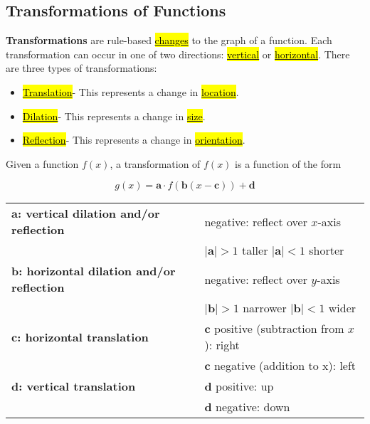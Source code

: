 \newpage

\subsection{Transformations of Functions}
\begin{definition}[transformation]
 \textbf{Transformations} are rule-based \underline{\hl{changes}} to the graph of a function. Each transformation can occur in one of two directions: \underline{\hl{vertical}} or \underline{\hl{horizontal}}. There are three types of transformations:
\begin{itemize}
    \item \underline{\hl{Translation}}- This represents a change in \underline{\hl{location}}.
    \item \underline{\hl{Dilation}}- This represents a change in \underline{\hl{size}}.
    \item \underline{\hl{Reflection}}- This represents a change in \underline{\hl{orientation}}.
\end{itemize}
\end{definition}
Given a function $f(x)$, a transformation of $f(x)$ is a function of the form

\vspace{-.25in}
\begin{center}
    \Huge{\[g(x)=\mathbf{a}\cdot f\left(\mathbf{b}\left(x-\mathbf{c}\right)\right)+\mathbf{d}\]}
\end{center}

\vspace{.5in}

\renewcommand{\arraystretch}{2}
\begin{tabular}{l l}\hline
    \textbf{$\mathbf{a}$: vertical dilation and/or reflection} & negative: reflect over $x$-axis\\
    & $\mathbf{|a|}>1$ taller \qquad $\mathbf{|a|}<1$ shorter\\ \hline
    \textbf{$\mathbf{b}$: horizontal dilation and/or reflection} & negative: reflect over $y$-axis\\
    & $\mathbf{|b|}>1$ narrower \qquad $\mathbf{|b|}<1$ wider\\ \hline
    \textbf{$\mathbf{c}$: horizontal translation} & $\mathbf{c}$ positive (subtraction from $x$): right\\
    & $\mathbf{c}$ negative (addition to x): left\\ \hline
    \textbf{$\mathbf{d}$: vertical translation} & $\mathbf{d}$ positive: up\\
    & $\mathbf{d}$ negative: down\\ \hline
\end{tabular}

